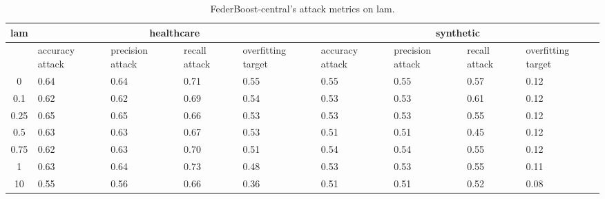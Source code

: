 \begin{table*}[]\centering
\begin{tabular}{|c| *{8}{m{1.0cm}|}}
\hline\rowcolor{gray!50}
\cellcolor{gray!80} lam & \multicolumn{4}{c|}{healthcare} & \multicolumn{4}{c|}{synthetic}\\\hline 
& accuracy attack & precision attack & recall attack & overfitting target & accuracy attack & precision attack & recall attack & overfitting target\\\hline
0 & 0.64 & 0.64 & 0.71 & 0.55 & 0.55 & 0.55 & 0.57 & 0.12\\ \hline
0.1 & 0.62 & 0.62 & 0.69 & 0.54 & 0.53 & 0.53 & 0.61 & 0.12\\ \hline
0.25 & 0.65 & 0.65 & 0.66 & 0.53 & 0.53 & 0.53 & 0.55 & 0.12\\ \hline
0.5 & 0.63 & 0.63 & 0.67 & 0.53 & 0.51 & 0.51 & 0.45 & 0.12\\ \hline
0.75 & 0.62 & 0.63 & 0.70 & 0.51 & 0.54 & 0.54 & 0.55 & 0.12\\ \hline
1 & 0.63 & 0.64 & 0.73 & 0.48 & 0.53 & 0.53 & 0.55 & 0.11\\ \hline
10 & 0.55 & 0.56 & 0.66 & 0.36 & 0.51 & 0.51 & 0.52 & 0.08\\ \hline
\end{tabular} 
\caption{FederBoost-central's attack metrics on lam.}
\label{tab:experiment1_lam}
\end{table*}
